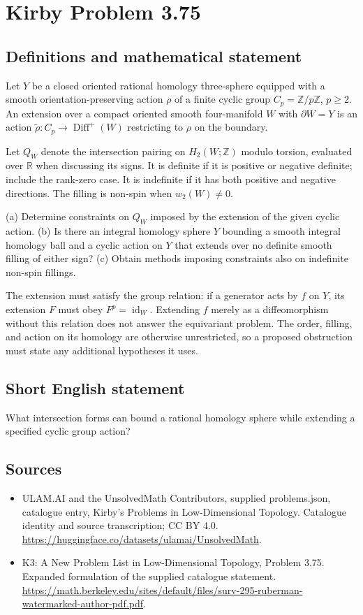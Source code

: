 \documentclass[11pt,a4paper]{article}
\begin{document}
\section*{Kirby Problem 3.75}\label{statement}

\subsection{Definitions and mathematical statement}
Let $Y$ be a closed oriented rational homology three-sphere equipped with a smooth orientation-preserving action $\rho$ of a finite cyclic group $C_p=\mathbb Z/p\mathbb Z$, $p\ge2$. An extension over a compact oriented smooth four-manifold $W$ with $\partial W=Y$ is an action $\widetilde\rho:C_p\to\operatorname{Diff}^+(W)$ restricting to $\rho$ on the boundary.

Let $Q_W$ denote the intersection pairing on $H_2(W;\mathbb Z)$ modulo torsion, evaluated over $\mathbb R$ when discussing its signs. It is definite if it is positive or negative definite; include the rank-zero case. It is indefinite if it has both positive and negative directions. The filling is non-spin when $w_2(W)\ne0$.

(a) Determine constraints on $Q_W$ imposed by the extension of the given cyclic action. (b) Is there an integral homology sphere $Y$ bounding a smooth integral homology ball and a cyclic action on $Y$ that extends over no definite smooth filling of either sign? (c) Obtain methods imposing constraints also on indefinite non-spin fillings.

The extension must satisfy the group relation: if a generator acts by $f$ on $Y$, its extension $F$ must obey $F^p=\operatorname{id}_W$. Extending $f$ merely as a diffeomorphism without this relation does not answer the equivariant problem. The order, filling, and action on its homology are otherwise unrestricted, so a proposed obstruction must state any additional hypotheses it uses.
\subsection{Short English statement}
What intersection forms can bound a rational homology sphere while extending a specified cyclic group action?
\subsection{Sources}
\begin{itemize}
\item[S1] ULAM.AI and the UnsolvedMath Contributors, supplied problems.json, catalogue entry, Kirby's Problems in Low-Dimensional Topology. Catalogue identity and source transcription; CC BY 4.0.
\url{https://huggingface.co/datasets/ulamai/UnsolvedMath}.
\item[S2] K3: A New Problem List in Low-Dimensional Topology, Problem 3.75. Expanded formulation of the supplied catalogue statement.
\url{https://math.berkeley.edu/sites/default/files/surv-295-ruberman-watermarked-author-pdf.pdf}.
\end{itemize}
\end{document}
